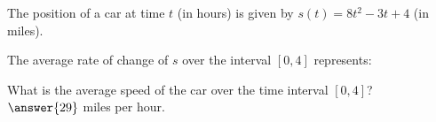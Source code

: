 \documentclass{ximera}
\author{Elizabeth Campolongo}
\begin{document}
\begin{exercise}
The position of a car at time $t$ (in hours) is given by $s(t) = 8t^2 -3t+4$ (in miles). 

The average rate of change of $s$ over the interval $[0,4]$ represents:
\begin{multipleChoice}
\end{multipleChoice}
\begin{exercise}
What is the average speed of the car over the time interval $[0,4]$?\\
$\answer{29}$ miles per hour.
\end{exercise}

\end{exercise}
\end{document}
